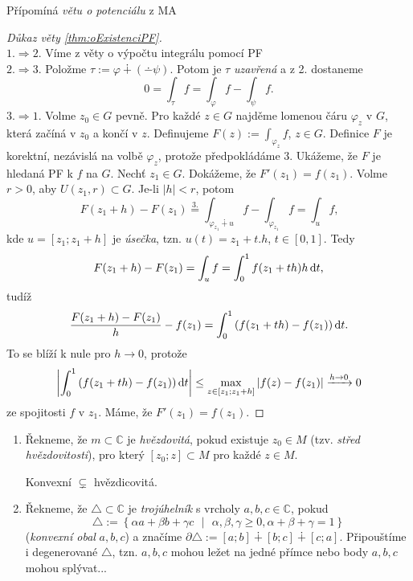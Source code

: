\begin{note}
Přípomíná \emph{větu o potenciálu} z MA 
\end{note}

\begin{proof}[Důkaz věty \cref{thm:oExistenciPF}]
\mbox{}\\
$1. \Rightarrow 2.$ Víme z věty o výpočtu integrálu pomocí PF\\
$2. \Rightarrow 3.$ Položme $\tau:=\varphi \dotplus(\dotminus\psi)$. Potom je $\tau$ \emph{uzavřená} a z 2. dostaneme $$0=\int_\tau f=\int_\varphi f - \int_\psi f\text{.}$$
$3. \Rightarrow 1.$ Volme $z_0\in G$ pevně. Pro každé $z\in G$ najděme lomenou čáru $\varphi_z$ v $G$, která začíná v $z_0$ a končí v $z$. 
Definujeme $F(z):=\int_{\varphi_z} f$, $z\in G$. 
Definice $F$ je korektní, nezávislá na volbě $\varphi_z$, protože předpokládáme 3. Ukážeme, že $F$ je hledaná PF k $f$ na $G$. Nechť $z_1\in G$. Dokážeme, že $F'(z_1)=f(z_1)$. 
Volme $r>0$, aby $U(z_1,r)\subset G$. Je-li $|h|<r$, 
potom $$F(z_1+h)-F(z_1)\stackrel{3.}{=}\int_{\varphi_{z_1}\dotplus u} f-\int_{\varphi_{z_1}}f=\int_u f\text{,}$$
kde $u=\left[z_1;z_1+h \right]$ je \emph{úsečka}, tzn. $u(t)=z_1+t.h$, $t\in[0,1]$. 
Tedy $$F(z_1+h)-F(z_1)=\int_u f=\int_0^1 f(z_1+th)h \mathop{}\!\mathrm{d} t\text{,}$$tudíž $$\frac{F(z_1+h)-F(z_1)}{h}-f(z_1)=\int_0^1 \left(f(z_1+th)-f(z_1)\right)\mathop{}\!\mathrm{d} t\text{.}$$ To se blíží k nule pro $h\rightarrow0$, protože 
$$\left| \int_0^1\left(f(z_1+th)-f(z_1)\right)\mathop{}\!\mathrm{d} t\right| \leq \max_{z\in[z_1;z_1+h]}\left|f(z)-f(z_1)\right| \xrightarrow{ h\rightarrow 0}0$$
ze spojitosti $f$ v $z_1$. Máme, že $F'(z_1)=f(z_1)$.
\end{proof}
\begin{notation}
\mbox{}
\begin{enumerate}
    \item 
        Řekneme, že $m\subset\mathbb{C}$ je \emph{hvězdovitá}, pokud existuje $z_0\in M$ (tzv. \emph{střed hvězdovitosti}), pro který $[z_0;z]\subset M$ pro každé $z\in M$.
        \begin{note*}
            Konvexní $\subsetneq$ hvězdicovitá.
        \end{note*}
    \item
        Řekneme, že $\triangle\subset\mathbb{C}$ 
        je \emph{trojúhelník} s vrcholy $a,b,c\in\mathbb{C}$, 
        pokud $$\triangle:=\left\{ \alpha a+\beta b + \gamma c\text{ }|\text{ }\alpha,\beta,\gamma\geq 0,\alpha+\beta+\gamma=1 \right\}$$ (\emph{konvexní obal }$a,b,c$) a značíme
        $\partial\triangle:=[a;b]\dotplus[b;c]\dotplus[c;a]$. 
        Připouštíme i degenerované $\triangle$, tzn. $a,b,c$ mohou ležet na jedné přímce nebo body $a,b,c$ mohou splývat...
\end{enumerate}
\end{notation}

